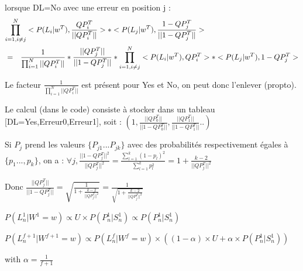 \documentclass{article}
\begin{document}
lorsque DL=No avec une erreur en position j :
\begin{eqnarray}
\lefteqn{\prod_{i=1,i \neq j}^{N} <P(L_i|w^T),\frac{QP_i^T}{||QP_i^T||}> * <P(L_j|w^T),\frac{1-QP_j^T}{||1-QP_j^T||}> }\\
& = &\frac{1}{\prod_{i=1}^{N} ||QP_i^T||}*\frac{||QP_j^T|| }{||1-QP_j^T||} * \prod_{i=1,i \neq j}^{N} <P(L_i|w^T),QP_i^T>* <P(L_j|w^T),1-QP_j^T>
\end{eqnarray}

Le facteur $\frac{1}{\prod_{i=1}^{N} ||QP_i^T||}$ est présent pour Yes et No, on peut donc l'enlever (propto).

Le calcul (dans le code) consiste à stocker dans un tableau [DL=Yes,Erreur0,Erreur1], soit :
$(1,\frac{||QP_0^T||}{||1-QP_0^T||},\frac{||QP_1^T||}{||1-QP_1^T||}..)$

  Si $P_j$ prend les valeurs $\{P_{j1}...P_{jk}\}$ avec des probabilités respectivement égales à $\{p_1...,p_k\}$, on a :
    $\forall j, \frac{||1-QP_j^T||^2}{||QP_j^T||^2}=\frac{\sum_{l=1}^{k}(1-p_l)^2}{\sum_{l=1}^{k}p_l^2}=1+\frac{k-2}{||QP_j^T||^2}$
    
Donc $\frac{||QP_j^T||}{||1-QP_j^T||}=\sqrt{\frac{1}{1+\frac{k-2}{||QP_j^T||^2}}}=\frac{1}{\sqrt{1+\frac{k-2}{||QP_j^T||^2}}}$

 
 $P(L_n^{1} | W^{1} = w) \propto U \times P(P_{n}^{1} | S_{n}^{1}) \propto P(P_{n}^{1} | S_{n}^{1})$
 
 $P(L_n^{f+1} | W^{f+1} = w) \propto P(L_n^f | W^f=w) \times ((1-\alpha)\times U + \alpha \times P(P_{n}^{1} | S_{n}^{1}))$
 
 with $ \alpha = \frac{1}{f+1}$
 
 

 
\end{document}
